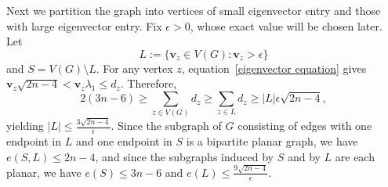 
Next we partition the graph into vertices of small eigenvector entry and those with large eigenvector entry.  Fix $\epsilon > 0$,
whose exact value will be chosen later.  Let 
\[
L:= \{\mathbf{v}_z\in V(G): \mathbf{v}_z> \epsilon\}
\]
and $S = V(G) \setminus L$. For any vertex $z$, equation~\eqref{eigenvector equation} gives $\mathbf{v}_z\sqrt{2n-4} < \mathbf{v}_z\lambda_1\leq d_z$. Therefore,
\[
2(3n - 6)  \geq \sum_{z\in V(G)} d_z \geq \sum_{z\in L} d_z \geq |L|\epsilon \sqrt{2n-4},
\]
yielding $|L| \leq \frac{3\sqrt{2n-4}}{\epsilon}$. Since the subgraph of $G$ consisting of edges with one endpoint in $L$ and one endpoint in $S$ is a bipartite planar graph, we have $e(S,L) \leq 2n-4$, and since the subgraphs induced by $S$ and by $L$ are each planar, we have $e(S) \leq 3n-6$ and $e(L) \leq \frac{9\sqrt{2n-4}}{\epsilon}$. 


